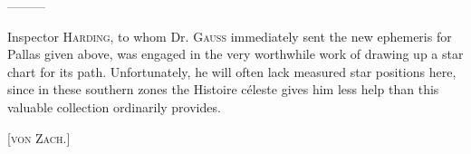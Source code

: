 —\quad—\quad—

Inspector \textsc{Harding}, to whom Dr. \textsc{Gauss} immediately sent the new ephemeris for Pallas given above, was engaged in the very worthwhile work of drawing up a star chart for its path. Unfortunately, he will often lack measured star positions here, since in these southern zones the Histoire céleste gives him less help than this valuable collection ordinarily provides.

\hfill[\textsc{von Zach.}]
